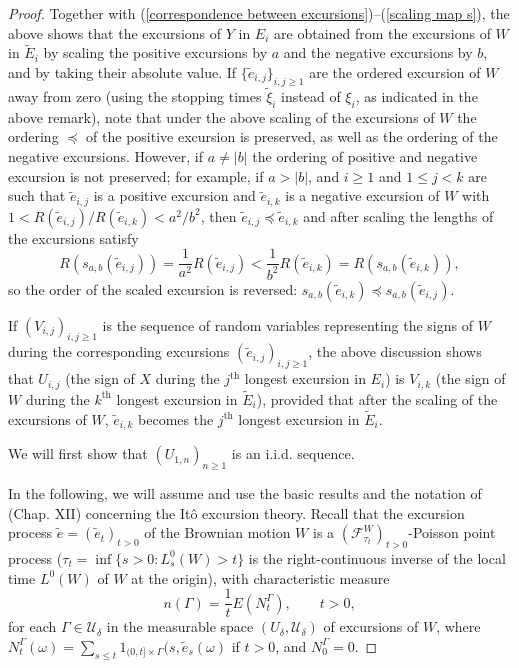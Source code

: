 \documentclass[reqno]{amsart}
\theoremstyle{definition}
\theoremstyle{remark}
\numberwithin{equation}{section}
\begin{document}
\begin{proof}
Together with (\ref{correspondence between excursions})--(\ref{scaling map s}), the above shows that the excursions of $Y$ in $E_i$ are obtained from the excursions of $W$ in $\widetilde{E}_i$ by scaling the positive excursions by $a$ and the negative excursions by $b$, and by taking their absolute value. If $\{\widetilde e_{i,j} \}_{i,j\geq 1}$ are the ordered excursion of $W$ away from zero (using the stopping times $\widetilde{\xi}_i$ instead of $\xi_i$, as indicated in the above remark), note that under the above scaling of the excursions of $W$ the ordering $\preceq$ of the positive excursion is preserved, as well as the ordering of the negative excursions. However, if $a\neq \vert b \vert$ the ordering of positive and negative excursion is not preserved; for example, if $a>\vert b\vert$, and $i\geq 1$ and $1\leq j<k$ are such that $\widetilde{e}_{i,j}$ is a positive excursion and $\widetilde{e}_{i,k}$ is a negative excursion of $W$ with $1< R(\widetilde e_{i,j}) / R(\widetilde e_{i,k})< a^2 /b^2$, then $\widetilde e_{i,j} \preceq \widetilde e_{i,k}$ and after scaling the lengths of the excursions satisfy
\begin{equation*}
R(s_{a,b}(\widetilde e_{i,j}))=\frac{1}{a^2} R(\widetilde e_{i,j}) < \frac{1}{b^2}R(\widetilde e_{i,k})=R(s_{a,b}(\widetilde e_{i,k})),
\end{equation*}
so the order of the scaled excursion is reversed: $s_{a,b}(\widetilde e_{i,k})\preceq s_{a,b}(\widetilde e_{i,j})$.

If $(V_{i,j})_{i,j\geq 1}$ is the sequence of random variables representing the signs of $W$ during the corresponding excursions $(\widetilde e_{i,j})_{i,j\geq1}$, the above discussion shows that $U_{i,j}$ (the sign of $X$ during the $j^\text{th}$ longest excursion in $E_i$) is $V_{i,k}$ (the sign of $W$ during the $k^\text{th}$ longest excursion in $\widetilde E_i$), provided that after the scaling of the excursions of $W$, $\widetilde e_{i,k}$ becomes the $j^\text{th}$ longest excursion in $\widetilde E_{i}$.

We will first show that $(U_{1,n})_{n\geq 1}$ is an i.i.d. sequence.

In the following, we will assume and use the basic results and the notation of \cite{Revuz and Yor} (Chap. XII) concerning the It\^{o} excursion theory. Recall that the excursion process $\widetilde{e}=(\widetilde{e}_t)_{t>0}$ of the Brownian motion $W$ is a  $(\mathcal{F}_{\tau_t}^W)_{t> 0}$-Poisson point process ($\tau_t=\inf\{s> 0: L_s^0(W)>t\}$ is the right-continuous inverse of the local time $L^0(W)$ of $W$ at the origin), with characteristic measure
\begin{equation}
n (\Gamma)=\frac{1}{t} E(N_t^\Gamma), \qquad t>0,
\end{equation}
for each $\Gamma \in \mathcal{U}_\delta$ in the measurable space $({U}_\delta, \mathcal{U}_\delta)$ of excursions  of $W$, where $N_t^{\Gamma}(\omega)=\sum_{s\le t} 1_{(0,t]\times \Gamma}(s,\widetilde{e}_s(\omega)$ if $t>0$, and $N_0^\Gamma=0$.


\end{proof}
\end{document}
